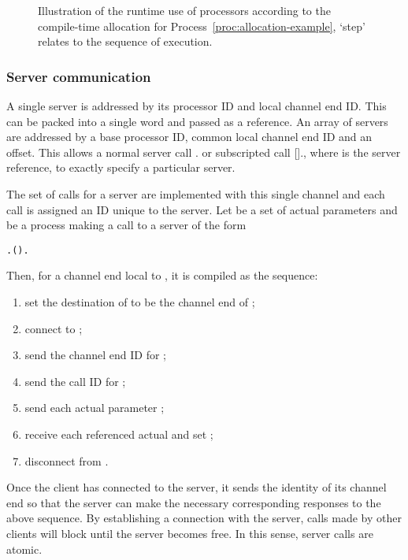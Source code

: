 \documentclass[11pt, conference, compsocconf, onecolumn]{IEEEtran}
\newcommand{\ben}{\begin{enumerate}}
\newcommand{\een}{\end{enumerate}}
\newcommand{\proc}[1]{Process~\ref{proc:#1}}
\newcounter{process}
\newcommand{\inputtikz}[1]{
\begin{center}\end{center}}
\def\codespacing{1.5mm}
\newenvironment{myquote}
{\list{}{\leftmargin=4mm\rightmargin=4mm}\item[]}
{\endlist}
\newcommand{\code}[1]{
\vspace{\codespacing}\begin{myquote}\begin{alltt}#1\end{alltt}\end{myquote}\vspace{\codespacing}
}
\begin{document}
\begin{figure}[t]
\inputtikz{figures/processor-allocation}

\caption{Illustration of the runtime use of processors according to the
compile-time allocation for \proc{allocation-example}, `step' relates to
the sequence of execution.}
\label{fig:processor-allocation}

\end{figure}

\subsubsection{Server communication}

A single server is addressed by its processor ID and local channel end ID. This
can be packed into a single word and passed as a reference. An array of
servers are addressed by a base processor ID, common local channel end ID and
an offset. This allows a normal server call . or subscripted call
[]., where  is the server reference, to exactly specify a
particular server.

The set of calls for a server are implemented with this single channel and each
call is assigned an ID unique to the server.  
Let  be a set of actual parameters and  be a
process making a call  to a server  of the form \code{.().} Then, for a channel end  local to , it is compiled as
the sequence: 
\ben

\item set the destination of  to be the channel end of ;

\item connect to ;

\item send the channel end ID for ;

\item send the call ID for ;

\item send each actual parameter ;

\item receive each referenced actual  and set ;

\item disconnect from .

\een
Once the client has connected to the server, it sends the identity of its
channel end so that the server can make the necessary corresponding responses
to the above sequence.
By establishing a connection with the server, calls made by other clients will
block until the server becomes free. In this sense, server calls are atomic.
\end{document}
